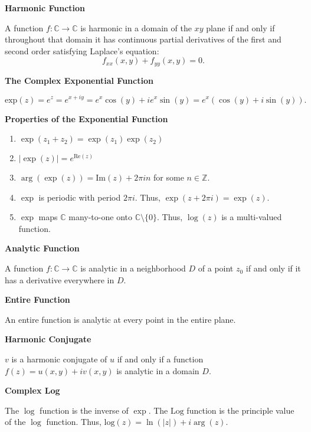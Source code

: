 \documentclass{article}
\newcommand{\C}{\mathbb C}
\begin{document}
\medskip\noindent\textbf{Harmonic Function}

	A function $f: \C \to \C$ is harmonic in a domain of the $xy$ plane if and only if throughout that domain it has continuous partial derivatives of the first and second order satisfying Laplace's equation: $$f_{xx}(x,y) + f_{yy}(x,y)=0.$$

\medskip\noindent\textbf{The Complex Exponential Function}

	$$\text{exp}(z) = e^z = e^{x+iy} = e^x\cos(y) + ie^x\sin(y) = e^x(\cos(y)+i\sin(y)).$$

\medskip\noindent\textbf{Properties of the Exponential Function}
\begin{enumerate}
	\item $\exp(z_1 + z_2) = \exp(z_1)\exp(z_2)$
	\item $|\exp(z)| = e^{\text{Re}(z)}$
	\item $\arg(\exp(z)) = \text{Im}(z) + 2\pi in$ for some $n \in \mathbb Z$.
	\item $\exp$ is periodic with period $2\pi i$. Thus, $\exp(z+2\pi i) = \exp(z).$
	\item $\exp$ maps $\C$ many-to-one onto $\C \setminus \{0\}$. Thus, $\log(z)$ is a multi-valued function.
\end{enumerate}

\medskip\noindent\textbf{Analytic Function}

	A function $f: \C \to \C$ is analytic in a neighborhood $D$ of a point $z_0$ if and only if it has a derivative everywhere in $D$.

\medskip\noindent\textbf{Entire Function}

	An entire function is analytic at every point in the entire plane.

\medskip\noindent\textbf{Harmonic Conjugate}

	$v$ is a harmonic conjugate of $u$ if and only if a function $f(z)=u(x,y) + iv(x,y)$ is analytic in a domain $D$.

\medskip\noindent\textbf{Complex Log}

	The $\log$ function is the inverse of $\exp$. The $\text{Log}$ function is the principle value of the $\log$ function.
	Thus, $\text{log}(z) = \ln(|z|) + i\arg(z)$.
\end{document}
